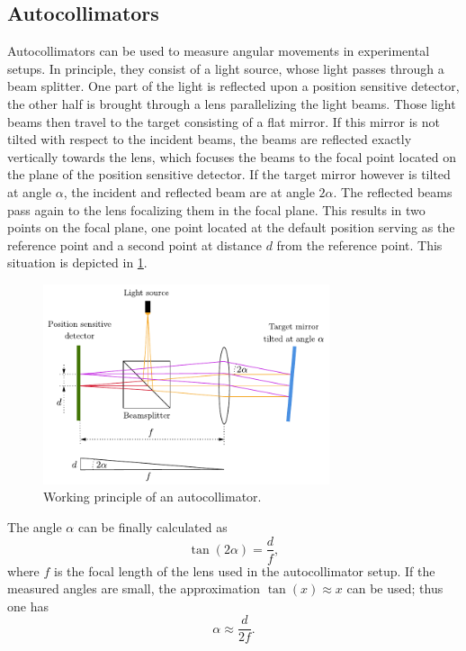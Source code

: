 \documentclass{report}
\numberwithin{tm}{section}
\begin{document}
\subsection{Autocollimators}
Autocollimators can be used to measure angular movements in experimental setups. In principle, they consist of a light source, whose light passes through a beam splitter. One part of the light is reflected upon a position sensitive detector, the other half is brought through a lens parallelizing the light beams. Those light beams then travel to the target consisting of a flat mirror. If this mirror is not tilted with respect to the incident beams, the beams are reflected exactly vertically towards the lens, which focuses the beams to the focal point located on the plane of the position sensitive detector. If the target mirror however is tilted at angle $\alpha$, the incident and reflected beam are at angle $2\alpha$. The reflected beams pass again to the lens focalizing them in the focal plane. This results in two points on the focal plane, one point located at the default position serving as the reference point and a second point at distance $d$ from the reference point. This situation is depicted in \cref{fig:autocollimator}.
\begin{figure}[h]
	 \centering
	 \includegraphics[width=0.75\textwidth]{figures/autocollimator.pdf}
	 \caption{Working principle of an autocollimator.}
	 \label{fig:autocollimator}
\end{figure}
The angle $\alpha$ can be finally calculated as \begin{equation}
	\tan(2\alpha) = \frac{d}{f},
\end{equation} where $f$ is the focal length of the lens used in the autocollimator setup. If the measured angles are small, the approximation $\tan(x) \approx x$ can be used; thus one has \begin{equation}
\alpha \approx \frac{d}{2f}.
\end{equation}
\end{document}
